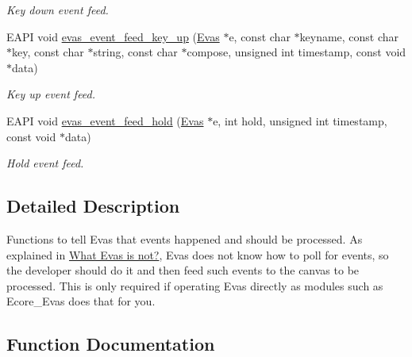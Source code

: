\begin{DoxyCompactItemize}
\begin{DoxyCompactList}\small\item\em Key down event feed. \item\end{DoxyCompactList}\item 
EAPI void \hyperlink{group__Evas__Event__Feeding__Group_gaebe7d4f8b6423aff1ffe67c724d4590d}{evas\_\-event\_\-feed\_\-key\_\-up} (\hyperlink{group__Evas__Canvas_ga5ff87cc4ce6bc43e3b640a6d37f73043}{Evas} $\ast$e, const char $\ast$keyname, const char $\ast$key, const char $\ast$string, const char $\ast$compose, unsigned int timestamp, const void $\ast$data)
\begin{DoxyCompactList}\small\item\em Key up event feed. \item\end{DoxyCompactList}\item 
EAPI void \hyperlink{group__Evas__Event__Feeding__Group_gaedc3a956cd753acdd2a58ad0d2865d04}{evas\_\-event\_\-feed\_\-hold} (\hyperlink{group__Evas__Canvas_ga5ff87cc4ce6bc43e3b640a6d37f73043}{Evas} $\ast$e, int hold, unsigned int timestamp, const void $\ast$data)
\begin{DoxyCompactList}\small\item\em Hold event feed. \item\end{DoxyCompactList}\end{DoxyCompactItemize}


\subsection{Detailed Description}
Functions to tell Evas that events happened and should be processed. As explained in \hyperlink{index_intro_not_evas}{What Evas is not?}, Evas does not know how to poll for events, so the developer should do it and then feed such events to the canvas to be processed. This is only required if operating Evas directly as modules such as Ecore\_\-Evas does that for you. 

\subsection{Function Documentation}
